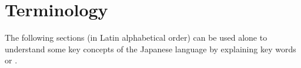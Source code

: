 \chapter{Terminology}
\label{chap:Terminology}
\label{sec:Terminology}

The following sections (in Latin alphabetical order) can be used alone to
understand some key concepts of the Japanese language by explaining key words
or .

\begingroup
\setlength{\cftbeforejtermtitleskip}{-2em}
\listofjterminology
\endgroup


